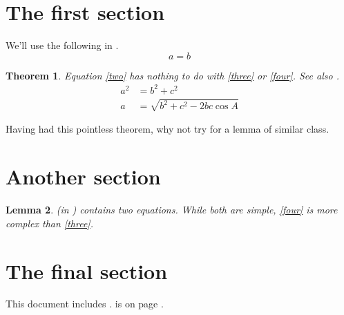 \documentclass{article}
\newtheorem{theorem}{Theorem}{Theorems}
\newtheorem{lemma}[theorem]{Lemma}{Lemmas}
\begin{document}
\section{The first section}
\label{zero}
We'll use the following in .
\begin{equation}
a = b\label{two}
\end{equation}
\begin{theorem}
\label{one}
Equation \eqref{two} has nothing to do with \eqref{three} or \eqref{four}.
See also .
\begin{align}
a^2&=b^2+c^2\label{three}\\
a&=\sqrt{b^2+c^2-2bc\cos A}\label{four}
\end{align}
\end{theorem}
Having had this pointless theorem, why not try for a lemma of similar
class.
\section{Another section}
\label{five}
\begin{lemma}
\label{six}
 (in ) contains two equations.
While both are simple, \eqref{four} is more complex than \eqref{three}.
\end{lemma}
\section{The final section}
\label{seven}
This document includes .
 is on page \pageref{lemma:six}.
\end{document}
